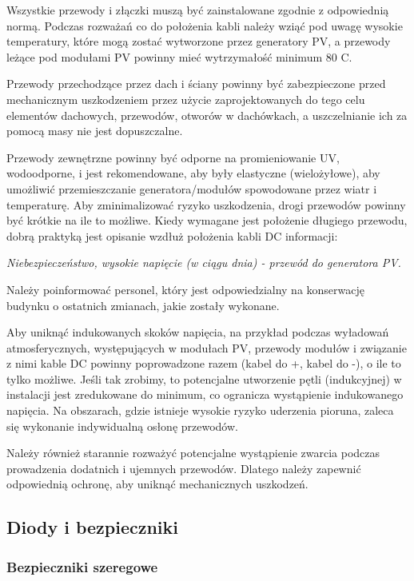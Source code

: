 \documentclass[12pt,a4paper]{article}
\begin{document}
Wszystkie przewody i złączki muszą być zainstalowane zgodnie z 
odpowiednią normą. Podczas rozważań co do położenia kabli należy wziąć 
pod uwagę wysokie temperatury, które mogą zostać wytworzone przez 
generatory PV, a przewody leżące pod modułami PV powinny mieć 
wytrzymałość minimum 80 \degree C. 

Przewody przechodzące przez dach i ściany powinny być zabezpieczone 
przed mechanicznym uszkodzeniem przez użycie zaprojektowanych do tego 
celu elementów dachowych, przewodów, otworów w dachówkach, a 
uszczelnianie ich za pomocą masy nie jest dopuszczalne. 

Przewody zewnętrzne powinny być odporne na promieniowanie UV, 
wodoodporne, i jest rekomendowane, aby były elastyczne (wielożyłowe), 
aby umożliwić przemieszczanie generatora/modułów spowodowane przez wiatr 
i temperaturę. Aby zminimalizować ryzyko uszkodzenia, drogi przewodów powinny być krótkie na ile to możliwe. 
Kiedy wymagane jest położenie długiego przewodu, dobrą praktyką jest 
opisanie wzdłuż położenia kabli DC informacji: 
\begin{displayquote}
\textit{Niebezpieczeństwo, wysokie napięcie (w ciągu dnia) - przewód do generatora PV.}
\end{displayquote}
 Należy 
poinformować personel, który jest odpowiedzialny na konserwację budynku 
o ostatnich zmianach, jakie zostały wykonane. 

Aby uniknąć indukowanych skoków napięcia, na przykład podczas wyładowań 
atmosferycznych, występujących w modułach PV, przewody modułów i 
związanie z nimi kable DC powinny poprowadzone razem (kabel do +, kabel 
do -), o ile to tylko możliwe. Jeśli tak zrobimy, to potencjalne 
utworzenie pętli (indukcyjnej) w instalacji jest zredukowane do minimum, 
co ogranicza wystąpienie indukowanego napięcia. Na obszarach, gdzie 
istnieje wysokie ryzyko uderzenia pioruna, zaleca się wykonanie 
indywidualną osłonę przewodów. 

Należy również starannie rozważyć potencjalne wystąpienie zwarcia 
podczas prowadzenia dodatnich i ujemnych przewodów. Dlatego należy 
zapewnić odpowiednią ochronę, aby uniknąć mechanicznych uszkodzeń. 

\subsection{Diody i bezpieczniki}
 
\subsubsection{Bezpieczniki szeregowe}
\end{document}
